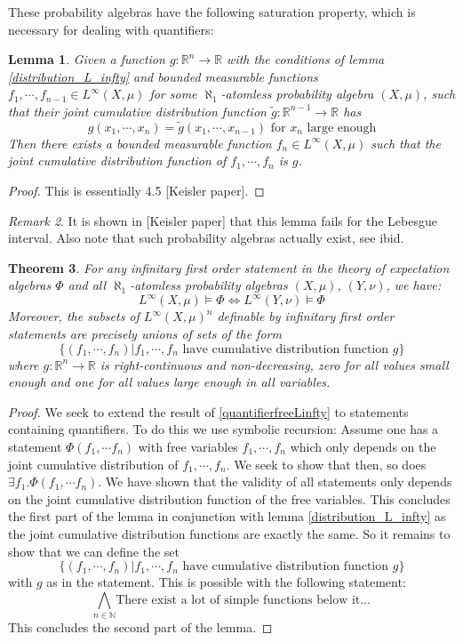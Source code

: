 \documentclass[a4paper]{amsproc}
\theoremstyle{plain}
\newtheorem{theorem}{Theorem}[section]
\newtheorem{lemma}[theorem]{Lemma}
\theoremstyle{definition}
\theoremstyle{remark}
\newtheorem{remark}[theorem]{Remark}
\numberwithin{equation}{section}
\begin{document}
These probability algebras have the following saturation property, which is necessary for dealing with quantifiers:
\begin{lemma} Given a function $g:\mathbb{R}^n\rightarrow \mathbb{R}$ with the conditions of lemma \ref{distribution_L_infty} and bounded measurable functions $f_1,\cdots, f_{n-1}\in L^\infty(X,\mu)$ for some $\aleph_1$-atomless probability algebra $(X,\mu)$, such that their joint cumulative distribution function $\tilde{g}:\mathbb{R}^{n-1}\rightarrow \mathbb{R}$ has
\[g(x_1,\cdots, x_n)=\tilde{g}(x_1,\cdots, x_{n-1}) \text{ for }x_n\text{ large enough} \]
Then there exists a bounded measurable function $f_n\in L^\infty(X,\mu)$ such that the joint cumulative distribution function of $f_1,\cdots,f_n $ is $g$.
\end{lemma}
\begin{proof}
This is essentially 4.5 [Keisler paper].
\end{proof}
\begin{remark} It is shown in [Keisler paper] that this lemma fails for the Lebesgue interval. Also note that such probability algebras actually exist, see ibid.
\end{remark}
\begin{theorem}
For any infinitary first order statement in the theory of expectation algebras $\Phi$ and all $\aleph_1$-atomless probability algebras $(X,\mu)$, $(Y,\nu)$, we have:
\[L^\infty(X,\mu)\vDash\Phi \iff L^\infty(Y,\nu)\vDash\Phi \]
Moreover, the subsets of $L^\infty(X,\mu)^n$ definable by infinitary first order statements are precisely unions of sets of the form
\[\{(f_1,\cdots,f_n)|f_1,\cdots,f_n \text{ have cumulative distribution function }g \} \]
where $g:\mathbb{R}^n\rightarrow\mathbb{R}$ is right-continuous and non-decreasing, zero for all values small enough and one for all values large enough in all variables.
\end{theorem}
\begin{proof}
We seek to extend the result of \ref{quantifierfreeLinfty} to statements containing quantifiers. To do this we use symbolic recursion:\newline
\indent Assume one has a statement $\Phi(f_1,\cdots f_n)$ with free variables $f_1,\cdots, f_n$ which only depends on the joint cumulative distribution of $f_1,\cdots, f_n$. We seek to show that then, so does $\exists f_1.\Phi(f_1,\cdots f_n)$. \newline
\indent We have shown that the validity of all statements only depends on the joint cumulative distribution function of the free variables. This concludes the first part of the lemma in conjunction with lemma \ref{distribution_L_infty} as the joint cumulative distribution functions are exactly the same.\newline
\indent So it remains to show that we can define the set 
\[\{(f_1,\cdots,f_n)|f_1,\cdots,f_n \text{ have cumulative distribution function }g \} \]
 with $g$ as in the statement. This is possible with the following statement:
 \[\bigwedge_{n\in \mathbb{N}}\text{There exist a lot of simple functions below it...} \]
This concludes the second part of the lemma.
\end{proof}
\end{document}
